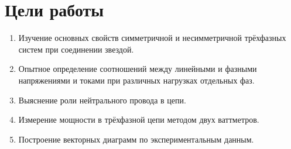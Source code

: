 \section{Цели работы}

\begin{enumerate}

\item Изучение основных свойств симметричной и несимметричной трёхфазных систем при соединении звездой. 
\item Опытное определение соотношений между линейными и фазными напряжениями и токами при различных нагрузках отдельных фаз. 
\item Выяснение роли нейтрального провода в цепи.
\item Измерение мощности в трёхфазной цепи методом двух ваттметров.
\item Построение векторных диаграмм по экспериментальным данным.

\end{enumerate}


